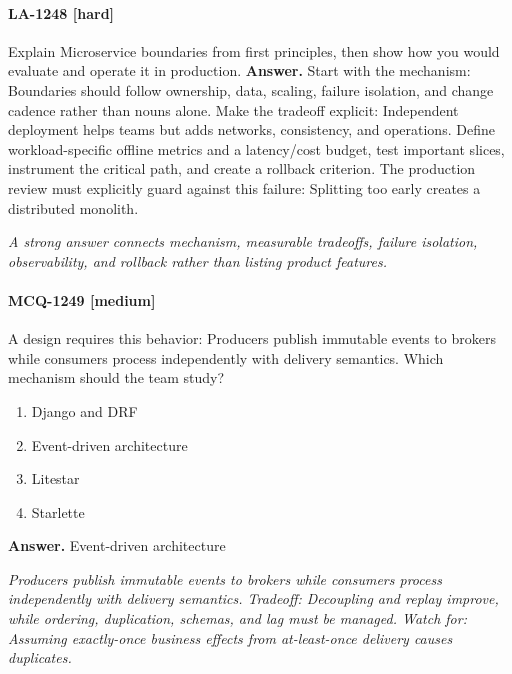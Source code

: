 \paragraph{LA-1248 [hard]} Explain Microservice boundaries from first principles, then show how you would evaluate and operate it in production.
\noindent\textbf{Answer.} Start with the mechanism: Boundaries should follow ownership, data, scaling, failure isolation, and change cadence rather than nouns alone. Make the tradeoff explicit: Independent deployment helps teams but adds networks, consistency, and operations. Define workload-specific offline metrics and a latency/cost budget, test important slices, instrument the critical path, and create a rollback criterion. The production review must explicitly guard against this failure: Splitting too early creates a distributed monolith.
\par\textit{A strong answer connects mechanism, measurable tradeoffs, failure isolation, observability, and rollback rather than listing product features.}
\paragraph{MCQ-1249 [medium]} A design requires this behavior: Producers publish immutable events to brokers while consumers process independently with delivery semantics. Which mechanism should the team study?
\begin{enumerate}[label=\Alph*.]
\item Django and DRF
\item Event-driven architecture
\item Litestar
\item Starlette
\end{enumerate}
\noindent\textbf{Answer.} Event-driven architecture
\par\textit{Producers publish immutable events to brokers while consumers process independently with delivery semantics. Tradeoff: Decoupling and replay improve, while ordering, duplication, schemas, and lag must be managed. Watch for: Assuming exactly-once business effects from at-least-once delivery causes duplicates.}
